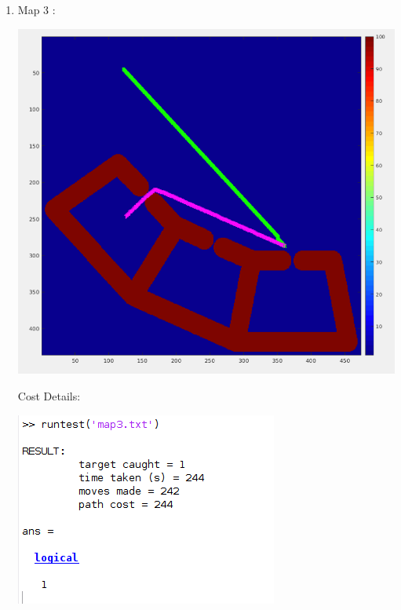 \documentclass[12pt]{article}
\begin{document}
\begin{enumerate}
    \item Map 3 : 
    \begin{center}
    \includegraphics[scale = 0.4]{16782_HW1_fall19_v2/pictures/map3.png} \\
    \end{center}
    
    Cost Details:
    \begin{center}
    \includegraphics[scale = 0.6]{16782_HW1_fall19_v2/pictures/map3_cost.png} \\
    \end{center}
    
    \pagebreak
    

\end{enumerate}
\end{document}
